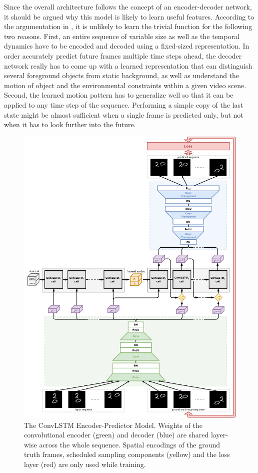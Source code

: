Since the overall architecture follows the concept of an encoder-decoder network, it should be argued why this model is likely to learn useful features. According to the argumentation in \parencite[p. 3f.]{unsup_learn_lstm}, it is unlikely to learn the trivial function for the following two reasons. First, an entire sequence of variable size as well as the temporal dynamics have to be encoded and decoded using a fixed-sized representation. In order accurately predict future frames multiple time steps ahead, the decoder network really has to come up with a learned representation that can distinguish several foreground objects from static background, as well as understand the motion of object and the environmental constraints within a given video scene. Second, the learned motion pattern has to generalize well so that it can be applied to any time step of the sequence. Performing a simple copy of the last state might be almost sufficient when a single frame is predicted only, but not when it has to look further into the future.

\begin{figure}[p]
	\centering
	\includegraphics[width=0.96\linewidth]{figures/total_model.pdf}
	\caption[ConvLSTM Encoder-Predictor Model]{The ConvLSTM Encoder-Predictor Model. Weights of the convolutional encoder (green) and decoder (blue) are shared layer-wise across the whole sequence. Spatial encodings of the ground truth frames, scheduled sampling components (yellow) and the loss layer (red) are only used while training.} \label{fig:total_model}
\end{figure}